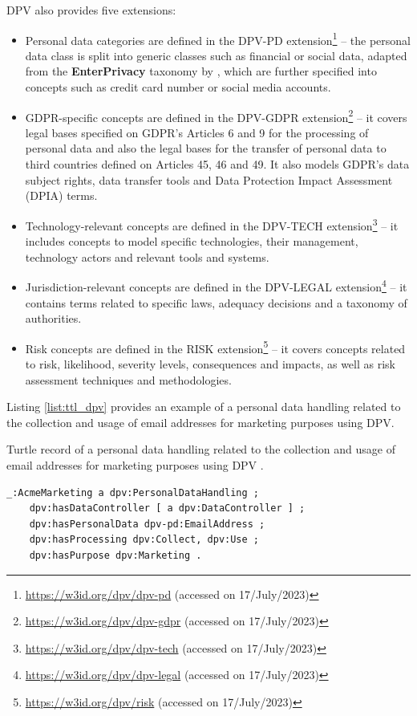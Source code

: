 DPV also provides five extensions:
\begin{itemize}
    \item Personal data categories are defined in the DPV-PD extension\footnote{\url{https://w3id.org/dpv/dpv-pd} (accessed on 17/July/2023)} -- the personal data class is split into generic classes such as financial or social data, adapted from the \textbf{EnterPrivacy} taxonomy by \cite{cronk_categories_2017}, which are further specified into concepts such as credit card number or social media accounts.
    \item GDPR-specific concepts are defined in the DPV-GDPR extension\footnote{\url{https://w3id.org/dpv/dpv-gdpr} (accessed on 17/July/2023)} -- it covers legal bases specified on GDPR's Articles 6 and 9 for the processing of personal data and also the legal bases for the transfer of personal data to third countries defined on Articles 45, 46 and 49. It also models GDPR's data subject rights, data transfer tools and Data Protection Impact Assessment (DPIA) terms.
    \item Technology-relevant concepts are defined in the DPV-TECH extension\footnote{\url{https://w3id.org/dpv/dpv-tech} (accessed on 17/July/2023)} -- it includes concepts to model specific technologies, their management, technology actors and relevant tools and systems.
    \item Jurisdiction-relevant concepts are defined in the DPV-LEGAL extension\footnote{\url{https://w3id.org/dpv/dpv-legal} (accessed on 17/July/2023)} -- it contains terms related to specific laws, adequacy decisions and a taxonomy of authorities.
    \item Risk concepts are defined in the RISK extension\footnote{\url{https://w3id.org/dpv/risk} (accessed on 17/July/2023)} -- it covers concepts related to risk, likelihood, severity levels, consequences and impacts, as well as risk assessment techniques and methodologies.
\end{itemize}

Listing \ref{list:ttl_dpv} provides an example of a personal data handling related to the collection and usage of email addresses for marketing purposes using DPV.

\begin{listing}
\caption{Turtle record of a personal data handling related to the collection and usage of email addresses for marketing purposes using DPV \citep{panetto_creating_2019}.}
\label{list:ttl_dpv}
\begin{verbatim}
_:AcmeMarketing a dpv:PersonalDataHandling ;
    dpv:hasDataController [ a dpv:DataController ] ;
    dpv:hasPersonalData dpv-pd:EmailAddress ;
    dpv:hasProcessing dpv:Collect, dpv:Use ;
    dpv:hasPurpose dpv:Marketing .
\end{verbatim}
\end{listing}

